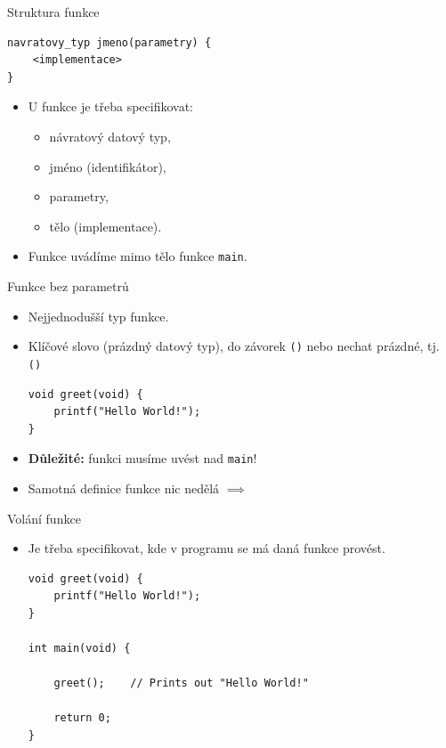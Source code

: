 \documentclass[14pt,aspectratio=169]{beamer}
\begin{document}
    \begin{frame}[t,fragile]{Struktura funkce}
        \begin{lstlisting}
navratovy_typ jmeno(parametry) {
    <implementace>
}
        \end{lstlisting}
        \begin{itemize}
            \item U funkce je třeba specifikovat:
            \begin{itemize}
                \item návratový datový typ,
                \item jméno (identifikátor),
                \item parametry,
                \item tělo (implementace).
            \end{itemize}
            \item Funkce uvádíme mimo tělo funkce \texttt{main}.
        \end{itemize}
    \end{frame}

    \begin{frame}[t,fragile]{Funkce bez parametrů}
        \begin{itemize}
            \item Nejjednodušší typ funkce.
            \item Klíčové slovo  (prázdný datový typ), do závorek \texttt{()} nebo nechat prázdné, tj. \texttt{()}
            \begin{lstlisting}
void greet(void) {
    printf("Hello World!");
}
            \end{lstlisting}
            \item \textbf{Důležité:} funkci musíme uvést nad \texttt{main}!
            \item Samotná definice funkce nic nedělá $\implies$ 
        \end{itemize}
    \end{frame}

    \begin{frame}[t,fragile]{Volání funkce}
        \begin{itemize}
            \item Je třeba specifikovat, kde v programu se má daná funkce provést.
            \begin{lstlisting}
void greet(void) {
    printf("Hello World!");
}
            
int main(void) {

    greet();    // Prints out "Hello World!"

    return 0;
}
            \end{lstlisting}
        \end{itemize}
    \end{frame}
\end{document}
